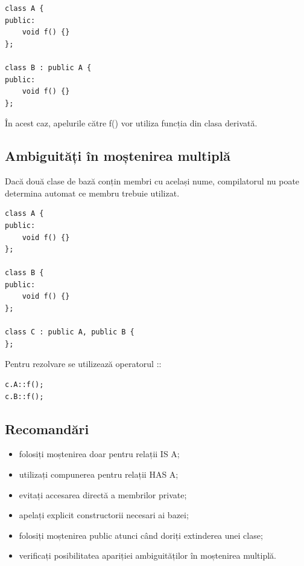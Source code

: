 \documentclass[12pt,a4paper]{article}
\begin{document}
\begin{verbatim}
class A {
public:
    void f() {}
};

class B : public A {
public:
    void f() {}
};
\end{verbatim}

În acest caz, apelurile către f() vor utiliza funcția din clasa derivată.

\subsection{Ambiguități în moștenirea multiplă}

Dacă două clase de bază conțin membri cu același nume, compilatorul nu poate determina automat ce membru trebuie utilizat.

\begin{verbatim}
class A {
public:
    void f() {}
};

class B {
public:
    void f() {}
};

class C : public A, public B {
};
\end{verbatim}

Pentru rezolvare se utilizează operatorul ::

\begin{verbatim}
c.A::f();
c.B::f();
\end{verbatim}

\subsection{Recomandări}

\begin{itemize}
\item folosiți moștenirea doar pentru relații IS A;
\item utilizați compunerea pentru relații HAS A;
\item evitați accesarea directă a membrilor private;
\item apelați explicit constructorii necesari ai bazei;
\item folosiți moștenirea public atunci când doriți extinderea unei clase;
\item verificați posibilitatea apariției ambiguităților în moștenirea multiplă.
\end{itemize}
\end{document}
